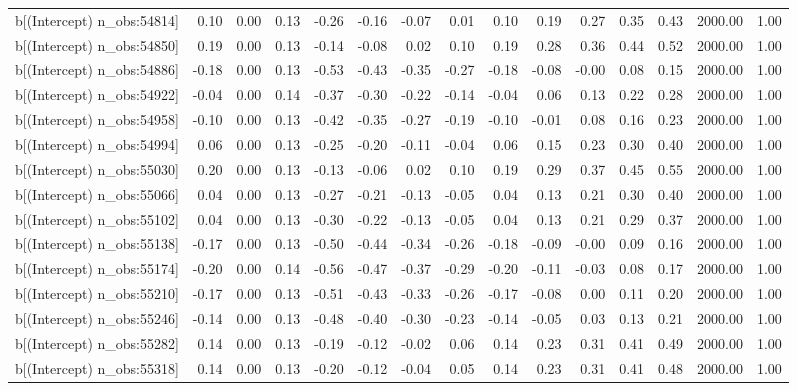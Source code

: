 \begin{table}[ht]
\begin{tabular}{rrrrrrrrrrrrrrr}
  b[(Intercept) n\_obs:54814] & 0.10 & 0.00 & 0.13 & -0.26 & -0.16 & -0.07 & 0.01 & 0.10 & 0.19 & 0.27 & 0.35 & 0.43 & 2000.00 & 1.00 \\ 
  b[(Intercept) n\_obs:54850] & 0.19 & 0.00 & 0.13 & -0.14 & -0.08 & 0.02 & 0.10 & 0.19 & 0.28 & 0.36 & 0.44 & 0.52 & 2000.00 & 1.00 \\ 
  b[(Intercept) n\_obs:54886] & -0.18 & 0.00 & 0.13 & -0.53 & -0.43 & -0.35 & -0.27 & -0.18 & -0.08 & -0.00 & 0.08 & 0.15 & 2000.00 & 1.00 \\ 
  b[(Intercept) n\_obs:54922] & -0.04 & 0.00 & 0.14 & -0.37 & -0.30 & -0.22 & -0.14 & -0.04 & 0.06 & 0.13 & 0.22 & 0.28 & 2000.00 & 1.00 \\ 
  b[(Intercept) n\_obs:54958] & -0.10 & 0.00 & 0.13 & -0.42 & -0.35 & -0.27 & -0.19 & -0.10 & -0.01 & 0.08 & 0.16 & 0.23 & 2000.00 & 1.00 \\ 
  b[(Intercept) n\_obs:54994] & 0.06 & 0.00 & 0.13 & -0.25 & -0.20 & -0.11 & -0.04 & 0.06 & 0.15 & 0.23 & 0.30 & 0.40 & 2000.00 & 1.00 \\ 
  b[(Intercept) n\_obs:55030] & 0.20 & 0.00 & 0.13 & -0.13 & -0.06 & 0.02 & 0.10 & 0.19 & 0.29 & 0.37 & 0.45 & 0.55 & 2000.00 & 1.00 \\ 
  b[(Intercept) n\_obs:55066] & 0.04 & 0.00 & 0.13 & -0.27 & -0.21 & -0.13 & -0.05 & 0.04 & 0.13 & 0.21 & 0.30 & 0.40 & 2000.00 & 1.00 \\ 
  b[(Intercept) n\_obs:55102] & 0.04 & 0.00 & 0.13 & -0.30 & -0.22 & -0.13 & -0.05 & 0.04 & 0.13 & 0.21 & 0.29 & 0.37 & 2000.00 & 1.00 \\ 
  b[(Intercept) n\_obs:55138] & -0.17 & 0.00 & 0.13 & -0.50 & -0.44 & -0.34 & -0.26 & -0.18 & -0.09 & -0.00 & 0.09 & 0.16 & 2000.00 & 1.00 \\ 
  b[(Intercept) n\_obs:55174] & -0.20 & 0.00 & 0.14 & -0.56 & -0.47 & -0.37 & -0.29 & -0.20 & -0.11 & -0.03 & 0.08 & 0.17 & 2000.00 & 1.00 \\ 
  b[(Intercept) n\_obs:55210] & -0.17 & 0.00 & 0.13 & -0.51 & -0.43 & -0.33 & -0.26 & -0.17 & -0.08 & 0.00 & 0.11 & 0.20 & 2000.00 & 1.00 \\ 
  b[(Intercept) n\_obs:55246] & -0.14 & 0.00 & 0.13 & -0.48 & -0.40 & -0.30 & -0.23 & -0.14 & -0.05 & 0.03 & 0.13 & 0.21 & 2000.00 & 1.00 \\ 
  b[(Intercept) n\_obs:55282] & 0.14 & 0.00 & 0.13 & -0.19 & -0.12 & -0.02 & 0.06 & 0.14 & 0.23 & 0.31 & 0.41 & 0.49 & 2000.00 & 1.00 \\ 
  b[(Intercept) n\_obs:55318] & 0.14 & 0.00 & 0.13 & -0.20 & -0.12 & -0.04 & 0.05 & 0.14 & 0.23 & 0.31 & 0.41 & 0.48 & 2000.00 & 1.00 \\ 

\end{tabular}
\end{table}

